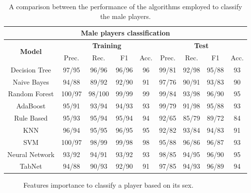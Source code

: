 \begin{table}[H]\footnotesize
\centering
\begin{tabular}{c|c|c|c|c|c|c|c|c}\hline \hline
\multicolumn{9}{c}{\textbf{Male players classification}}\\ \hline \hline
\multirow{2}{*}{\textbf{Model}} & \multicolumn{4}{c|}{\textbf{Training}} & \multicolumn{4}{c}{\textbf{Test}} \\\cline{2-9}
& Prec. & Rec. & F1 & Acc. & Prec. & Rec. & F1 & Acc. \\\hline
Decision Tree & 97/95 & 96/96 & 96/96 & 96 & 99/81 & 92/98 & 95/88 & 93 \\
Naive Bayes & 94/88 & 89/92 & 92/90 & 91 & 97/76 & 90/91 & 93/83 & 90\\
\rowcolor{yellow!70} Random Forest & 100/97 & 98/100 & 99/99 & 99 & 99/84 & 93/98 & 96/90 & 95\\
AdaBoost & 95/91 & 93/94 & 94/93 & 93& 99/79 & 91/98& 95/88 & 93\\
Rule Based & 95/93 & 95/94 & 95/94 & 94 & 92/65 & 85/79 & 89/72 & 84\\
KNN & 96/94 & 95/95 & 96/95 & 95 & 92/82 & 93/84 & 94/83 & 91\\
SVM & 100/97 & 98/99 & 99/98 & 98 & 95/88 & 96/86 & 96/87 & 93\\
\rowcolor{gray!40} Neural Network & 93/92 & 94/91 & 93/92 & 93 & 98/85 & 94/95 & 96/90 & 95\\
\rowcolor{brown!50}TabNet & 94/88 & 90/93 & 92/90 & 91 & 97/85 & 94/93 & 96/89 & 94\\\hline \hline
\end{tabular}
\caption{A comparison between the performance of the algorithms employed to classify the male players.}
\label{tab:male_compare}
\end{table}

\begin{figure}[H]
    \centering
    \caption{Features importance to classify a player based on its sex.}
    \label{fig:FeatImpSex}
\end{figure}